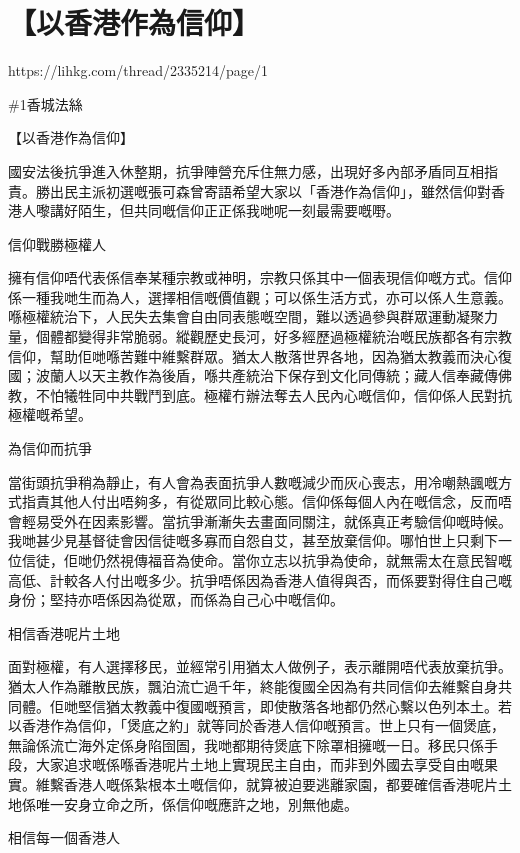 \chapter{【以香港作為信仰】}

https://lihkg.com/thread/2335214/page/1

\#1香城法絲



【以香港作為信仰】

國安法後抗爭進入休整期，抗爭陣營充斥住無力感，出現好多內部矛盾同互相指責。勝出民主派初選嘅張可森曾寄語希望大家以「香港作為信仰」，雖然信仰對香港人嚟講好陌生，但共同嘅信仰正正係我哋呢一刻最需要嘅嘢。

信仰戰勝極權人

擁有信仰唔代表係信奉某種宗教或神明，宗教只係其中一個表現信仰嘅方式。信仰係一種我哋生而為人，選擇相信嘅價值觀；可以係生活方式，亦可以係人生意義。喺極權統治下，人民失去集會自由同表態嘅空間，難以透過參與群眾運動凝聚力量，個體都變得非常脆弱。縱觀歷史長河，好多經歷過極權統治嘅民族都各有宗教信仰，幫助佢哋喺苦難中維繫群眾。猶太人散落世界各地，因為猶太教義而決心復國；波蘭人以天主教作為後盾，喺共產統治下保存到文化同傳統；藏人信奉藏傳佛教，不怕犧牲同中共戰鬥到底。極權冇辦法奪去人民內心嘅信仰，信仰係人民對抗極權嘅希望。

為信仰而抗爭

當街頭抗爭稍為靜止，有人會為表面抗爭人數嘅減少而灰心喪志，用冷嘲熱諷嘅方式指責其他人付出唔夠多，有從眾同比較心態。信仰係每個人內在嘅信念，反而唔會輕易受外在因素影響。當抗爭漸漸失去畫面同關注，就係真正考驗信仰嘅時候。我哋甚少見基督徒會因信徒嘅多寡而自怨自艾，甚至放棄信仰。哪怕世上只剩下一位信徒，佢哋仍然視傳福音為使命。當你立志以抗爭為使命，就無需太在意民智嘅高低、計較各人付出嘅多少。抗爭唔係因為香港人值得與否，而係要對得住自己嘅身份；堅持亦唔係因為從眾，而係為自己心中嘅信仰。

相信香港呢片土地

面對極權，有人選擇移民，並經常引用猶太人做例子，表示離開唔代表放棄抗爭。猶太人作為離散民族，飄泊流亡過千年，終能復國全因為有共同信仰去維繫自身共同體。佢哋堅信猶太教義中復國嘅預言，即使散落各地都仍然心繫以色列本土。若以香港作為信仰，「煲底之約」就等同於香港人信仰嘅預言。世上只有一個煲底，無論係流亡海外定係身陷囹圄，我哋都期待煲底下除罩相擁嘅一日。移民只係手段，大家追求嘅係喺香港呢片土地上實現民主自由，而非到外國去享受自由嘅果實。維繫香港人嘅係紮根本土嘅信仰，就算被迫要逃離家園，都要確信香港呢片土地係唯一安身立命之所，係信仰嘅應許之地，別無他處。

相信每一個香港人

